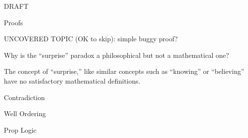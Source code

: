 \documentclass[quiz]{mcs}
\begin{document}


\examspace

\begin{center}
{\Large DRAFT}
\end{center}

\begin{center}
{\large Proofs}
\end{center}

UNCOVERED TOPIC (OK to skip): simple buggy proof?

\begin{problem}[points = 6, title= \textbf{Surprise paradox}]
Why is the ``surprise'' paradox a philosophical but not a mathematical one?

\begin{solution}
The concept of ``surprise,'' like similar concepts such as ``knowing''
or ``believing'' have no satisfactory mathematical definitions.
\end{solution}

\end{problem}

\examspace

\begin{center}
{\large Contradiction}
\end{center}


\examspace

\begin{center}
{\large Well Ordering}
\end{center}






\examspace

\begin{center}
{\large Prop Logic}
\end{center}
\end{document}
